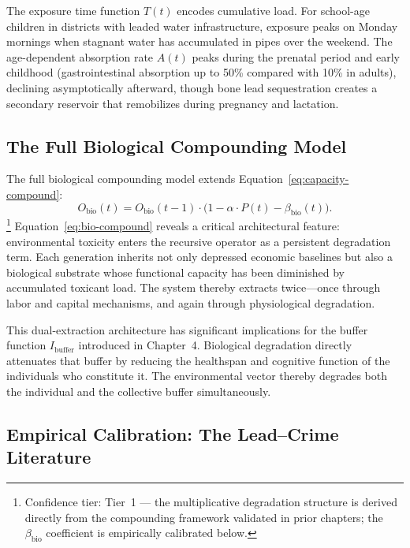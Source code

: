 The exposure time function $T(t)$ encodes cumulative load. For school-age
children in districts with leaded water infrastructure, exposure peaks on Monday
mornings when stagnant water has accumulated in pipes over the weekend.
The age-dependent absorption rate $A(t)$ peaks during the prenatal period and
early childhood (gastrointestinal absorption up to 50\% compared with 10\% in
adults), declining asymptotically afterward, though bone lead sequestration
creates a secondary reservoir that remobilizes during pregnancy and lactation.

\subsection{The Full Biological Compounding Model}

The full biological compounding model extends
Equation~\eqref{eq:capacity-compound}:
\begin{equation}
O_{\text{bio}}(t) = O_{\text{bio}}(t-1) \cdot \bigl(1 - \alpha \cdot P(t) - \beta_{\text{bio}}(t)\bigr).
\label{eq:bio-compound}
\end{equation}
\footnote{Confidence tier: Tier~1 --- the multiplicative degradation structure is
derived directly from the compounding framework validated in prior chapters; the
$\beta_{\text{bio}}$ coefficient is empirically calibrated below.}
Equation~\eqref{eq:bio-compound} reveals a critical architectural feature:
environmental toxicity enters the recursive operator as a persistent degradation
term. Each generation inherits not only depressed economic baselines but also a
biological substrate whose functional capacity has been diminished by
accumulated toxicant load. The system thereby extracts twice---once through
labor and capital mechanisms, and again through physiological degradation.

This dual-extraction architecture has significant implications for the buffer
function $I_{\text{buffer}}$ introduced in Chapter~4. Biological degradation
directly attenuates that buffer by reducing the healthspan and cognitive
function of the individuals who constitute it. The environmental vector thereby
degrades both the individual and the collective buffer simultaneously.

\subsection{Empirical Calibration: The Lead--Crime Literature}


